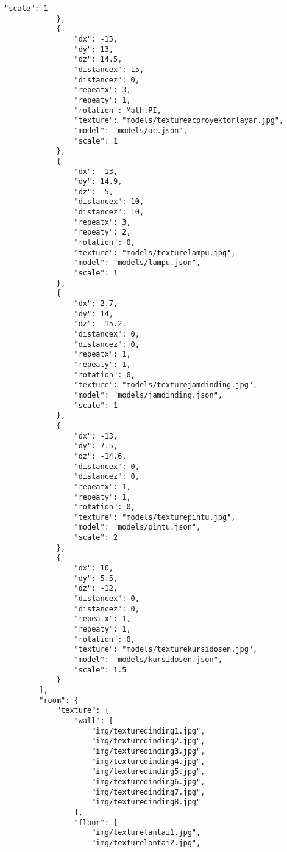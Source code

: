 \begin{lstlisting}[caption={Contoh JSON untuk ruangan kelas pada saat ujian.}, label={lst:json},captionpos=b]
                "scale": 1
            },
            {
                "dx": -15,
                "dy": 13,
                "dz": 14.5,
                "distancex": 15,
                "distancez": 0,
                "repeatx": 3,
                "repeaty": 1,
                "rotation": Math.PI,
                "texture": "models/textureacproyektorlayar.jpg",
                "model": "models/ac.json",
                "scale": 1
            },
            {
                "dx": -13,
                "dy": 14.9,
                "dz": -5,
                "distancex": 10,
                "distancez": 10,
                "repeatx": 3,
                "repeaty": 2,
                "rotation": 0,
                "texture": "models/texturelampu.jpg",
                "model": "models/lampu.json",
                "scale": 1
            },
            {
                "dx": 2.7,
                "dy": 14,
                "dz": -15.2,
                "distancex": 0,
                "distancez": 0,
                "repeatx": 1,
                "repeaty": 1,
                "rotation": 0,
                "texture": "models/texturejamdinding.jpg",
                "model": "models/jamdinding.json",
                "scale": 1
            },
            {
                "dx": -13,
                "dy": 7.5,
                "dz": -14.6,
                "distancex": 0,
                "distancez": 0,
                "repeatx": 1,
                "repeaty": 1,
                "rotation": 0,
                "texture": "models/texturepintu.jpg",
                "model": "models/pintu.json",
                "scale": 2
            },
            {
                "dx": 10,
                "dy": 5.5,
                "dz": -12,
                "distancex": 0,
                "distancez": 0,
                "repeatx": 1,
                "repeaty": 1,
                "rotation": 0,
                "texture": "models/texturekursidosen.jpg",
                "model": "models/kursidosen.json",
                "scale": 1.5
            }
        ],
        "room": {
            "texture": {
                "wall": [
                    "img/texturedinding1.jpg",
                    "img/texturedinding2.jpg",
                    "img/texturedinding3.jpg",
                    "img/texturedinding4.jpg",
                    "img/texturedinding5.jpg",
                    "img/texturedinding6.jpg",
                    "img/texturedinding7.jpg",
                    "img/texturedinding8.jpg"
                ],
                "floor": [
                    "img/texturelantai1.jpg",
                    "img/texturelantai2.jpg",

\end{lstlisting}
